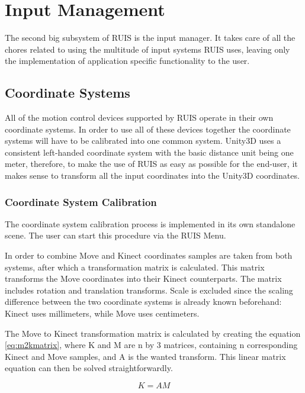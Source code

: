 \documentclass[12pt,a4paper,oneside,pdftex]{report}
\begin{document}
\chapter{Input Management}
\label{chapter:inputmanagement}

The second big subsystem of RUIS is the input manager. It takes care of all the chores related to using the multitude of input systems RUIS uses, leaving only the implementation of application specific functionality to the user.

\section{Coordinate Systems}
\label{section:coordinatesystem}

All of the motion control devices supported by RUIS operate in their own coordinate systems. In order to use all of these devices together the coordinate systems will have to be calibrated into one common system. Unity3D uses a consistent left-handed coordinate system with the basic distance unit being one meter, therefore, to make the use of RUIS as easy as possible for the end-user, it makes sense to transform all the input coordinates into the Unity3D coordinates.

\subsection{Coordinate System Calibration}
\label{subsection:coordinatesystems:calibration}

The coordinate system calibration process is implemented in its own standalone scene. The user can start this procedure via the RUIS Menu. 

In order to combine Move and Kinect coordinates samples are taken from both systems, after which a transformation matrix is calculated. This matrix transforms the Move coordinates into their Kinect counterparts. The matrix includes rotation and translation transforms. Scale is excluded since the scaling difference between the two coordinate systems is already known beforehand: Kinect uses millimeters, while Move uses centimeters.

The Move to Kinect transformation matrix is calculated by creating the equation \ref{eq:m2kmatrix}, where K and M are n by 3 matrices, containing n corresponding Kinect and Move samples, and A is the wanted transform. This linear matrix equation can then be solved straightforwardly.

\begin{equation}
    K = AM
    \label{eq:m2kmatrix}
\end{equation}
\end{document}
